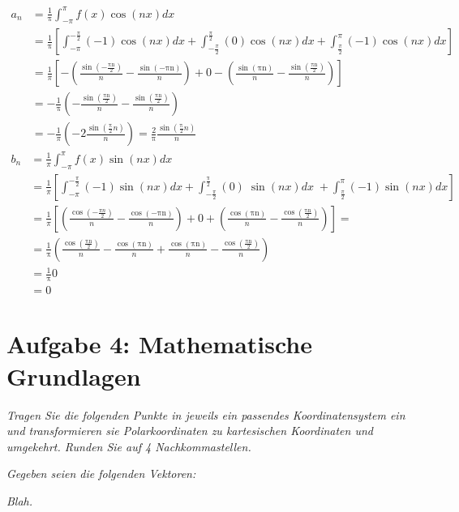 \documentclass[
  ngerman,
  DIV=14
]{scrartcl}
\begin{document}
\begin{align*}
a_n 
  &= \frac{1}{\mathrm\pi}
  \int_{-\pi}^\pi f(x)\cos(n x) dx\\
  &= \frac{1}{\mathrm\pi} \left[\int_{-\pi}^{-\frac{\pi}{2}} (-1) \cos(n x) dx + \int_{-\frac{\pi}{2}}^\frac{\pi}{2} (0) \cos(n x) dx + \int_\frac{\pi}{2}^\pi (-1) \cos(n x) dx\right]\\
&=\frac{1}{\pi}\left[-\left(\frac{\sin(-\frac{\mathrm{πn}}2)}n-\frac{\sin(-\mathrm{πn})}n\right)+0-\left(\frac{\sin(\mathrm{πn})}n-\frac{\sin(\frac{\mathrm{πn}}2)}n\right)\right]\\
&=-\frac1{\mathrm\pi}\left(-\frac{\sin(\frac{\mathrm{πn}}2)}n-\frac{\sin(\frac{\mathrm{πn}}2)}n\right)\\
&=-\frac{1}{\pi}\left(-2\frac{\sin(\frac{\mathrm\pi}2n)}{\displaystyle n}\right)=\frac2{\mathrm\pi}\frac{\sin(\frac{\mathrm\pi}{2} n)}{n}
\end{align*}
\begin{align*}
b_n 
&= \frac{1}{\pi} \int_{-\pi}^\pi f(x) \sin(n x) dx\\
& =\frac{1}{\pi} \left[\int_{-\pi}^{-\frac{\pi}{2}}(-1)\sin(n x) dx + \int_{-\frac{\pi}2}^\frac{\mathrm\pi}2(0)\;\sin(nx)dx\;+\int_\frac{\pi}{2}^\pi(-1)\sin(n x) dx\right]\\
&=\frac{1}{\pi}\left[\left(\frac{\cos(-\frac{\pi n}2)}n-\frac{\displaystyle\cos(-\mathrm{πn})}n\right)+0+\left(\frac{\displaystyle\cos(\mathrm{πn})}n-\frac{\displaystyle\cos(\frac{\mathrm{πn}}2)}n\right)\right]=\\
&=\frac1{\mathrm\pi}\left(\frac{\displaystyle\cos(\frac{\mathrm{πn}}2)}n-\frac{\displaystyle\cos(\mathrm{πn})}n+\frac{\displaystyle\cos(\mathrm{πn})}n-\frac{\displaystyle\cos(\frac{\mathrm{πn}}2)}n\right)\\
&=\frac1{\mathrm\pi}0\\
&=0
\end{align*}





\section*{Aufgabe 4: Mathematische Grundlagen}

\emph{Tragen Sie die folgenden Punkte in jeweils ein passendes Koordinatensystem ein und transformieren sie Polarkoordinaten zu kartesischen Koordinaten und umgekehrt. Runden Sie auf 4 Nachkommastellen.}

\emph{Gegeben seien die folgenden Vektoren:}

\emph{Blah.}
\end{document}
